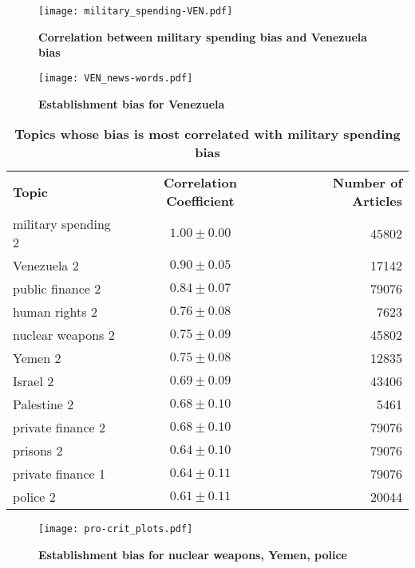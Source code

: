 \documentclass[10pt,letterpaper]{article}
\newlength\savedwidth
\newcommand\thickhline{\noalign{\global\savedwidth\arrayrulewidth\global\arrayrulewidth 2pt}%
\hline
\noalign{\global\arrayrulewidth\savedwidth}}
\begin{document}
\begin{figure}[tb]
\caption{{\bf Correlation between military spending bias and Venezuela bias}}
\texttt{[image: military\_spending-VEN.pdf]}
\label{militaryVen}
\end{figure}

\clearpage




\begin{figure}[tb]
\caption{{\bf Establishment bias for Venezuela}\\}
\hglue-5.89cm\texttt{[image: VEN\_news-words.pdf]}
\label{ven}
\end{figure}

\begin{table}[tb]
\begin{adjustwidth}{-2.25in}{0in} %
\centering
\caption{
{\bf Topics whose bias is most correlated with 
military spending bias}}
\begin{tabular}{|l|c|r|} \hline
\textbf{Topic} & \textbf{Correlation Coefficient} & \textbf{Number of Articles}\\ 
 \thickhline
military spending 2 & $1.00 \pm 0.00 $& 45802 \\ \hline
Venezuela 2 & $0.90 \pm 0.05 $& 17142 \\ \hline
public finance 2 & $0.84 \pm 0.07$ &  79076\\ \hline
human rights 2 & $0.76 \pm 0.08$ & 7623 \\ \hline
nuclear weapons 2 & $0.75 \pm 0.09$ & 45802 \\ \hline
Yemen 2 & $0.75 \pm 0.08$ & 12835 \\ \hline
Israel 2 & $0.69 \pm 0.09$ & 43406 \\ \hline
Palestine 2 & $0.68 \pm 0.10$ & 5461 \\ \hline
private finance 2 & $0.68 \pm 0.10$ & 79076 \\\hline
prisons 2 & $0.64 \pm 0.10$ & 79076 \\\hline
private finance 1 & $0.64 \pm 0.11$ & 79076 \\\hline
police 2 & $0.61 \pm 0.11$ & 20044 \\ \hline
\end{tabular}
\label{ms_corr}
\end{adjustwidth}
\end{table}

\clearpage

\begin{figure}[tb]
\caption{{\bf Establishment bias for nuclear weapons, Yemen, police}}
\hglue-6cm \texttt{[image: pro-crit\_plots.pdf]}
\label{pc_3plots}
\end{figure}
\end{document}
